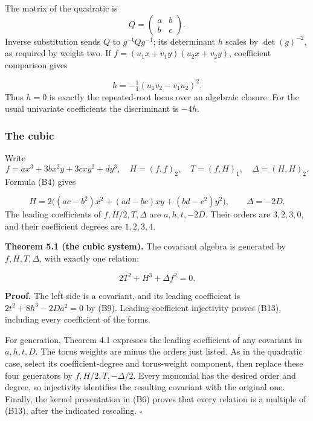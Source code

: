 \documentclass[
]{article}
\begin{document}
The matrix of the quadratic is \[
Q=\begin{pmatrix}a&b\\b&c\end{pmatrix}.
\] Inverse substitution sends \(Q\) to \(g^{-\mathsf t}Qg^{-1}\); its
determinant \(h\) scales by \(\det(g)^{-2}\), as required by weight two.
If \(f=(u_1x+v_1y)(u_2x+v_2y)\), coefficient comparison gives
\protect{}\label{equation-B11}{}

\[
h=-\tfrac14(u_1v_2-v_1u_2)^2.
\tag{B11}
\] Thus \(h=0\) is exactly the repeated-root locus over an algebraic
closure. For the usual univariate coefficients the discriminant is
\(-4h\).

\subsubsection{The cubic}\label{the-cubic}

Write \[
f=ax^3+3bx^2y+3cxy^2+dy^3,\quad
H=(f,f)_2,\quad T=(f,H)_1,\quad \Delta=(H,H)_2.
\] Formula (B4) gives \protect{}\label{equation-B12}{}

\[
H=2\bigl((ac-b^2)x^2+(ad-bc)xy+(bd-c^2)y^2\bigr),
\qquad \Delta=-2D.
\tag{B12}
\] The leading coefficients of \(f,H/2,T,\Delta\) are \(a,h,t,-2D\).
Their orders are \(3,2,3,0\), and their coefficient degrees are
\(1,2,3,4\).

\protect{}\label{theorem-5-1}{}

\textbf{Theorem 5.1 (the cubic system).} The covariant algebra is
generated by \(f,H,T,\Delta\), with exactly one relation:
\protect{}\label{equation-B13}{}

\[
2T^2+H^3+\Delta f^2=0.
\tag{B13}
\]

\textbf{Proof.} The left side is a covariant, and its leading
coefficient is \(2t^2+8h^3-2Da^2=0\) by (B9). Leading-coefficient
injectivity proves (B13), including every coefficient of the forms.

For generation, Theorem 4.1 expresses the leading coefficient of any
covariant in \(a,h,t,D\). The torus weights are minus the orders just
listed. As in the quadratic case, select its coefficient-degree and
torus-weight component, then replace these four generators by
\(f,H/2,T,-\Delta/2\). Every monomial has the desired order and degree,
so injectivity identifies the resulting covariant with the original one.
Finally, the kernel presentation in (B6) proves that every relation is a
multiple of (B13), after the indicated rescaling. \(\square\)
\end{document}
